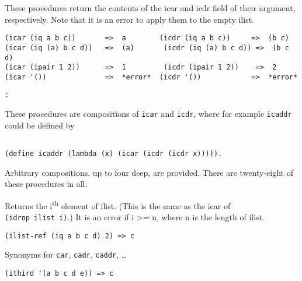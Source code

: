 \begin{entry}{%
  }

  These procedures return
  the contents of the icar and icdr field of their argument,
  respectively. Note that it is an error to apply them to the empty
  ilist.

\begin{verbatim}
(icar (iq a b c))       =>  a        (icdr (iq a b c))     =>  (b c)  
(icar (iq (a) b c d))   =>  (a)       (icdr (iq (a) b c d)) =>  (b c d)
(icar (ipair 1 2))      =>  1         (icdr (ipair 1 2))    =>  2      
(icar '())              =>  *error*  (icdr '())            =>  *error*
\end{verbatim}
\end{entry}
   
\begin{entry}{%
  \texttt{:}\\
  }

  These procedures are
  compositions of \texttt{icar} and \texttt{icdr}, where for example
  \texttt{icaddr} could be defined by

\begin{verbatim}
    
(define icaddr (lambda (x) (icar (icdr (icdr x))))).
\end{verbatim}

  Arbitrary compositions, up to four deep, are provided. There are
  twenty-eight of these procedures in all.
\end{entry}

\begin{entry}{%
  }

  Returns the
  i\textsuperscript{th} element of ilist. (This is the same as the
  icar of \texttt{(idrop\ ilist\ i)}.) It is an error if i
  \textgreater{}= n, where n is the length of ilist.

\begin{verbatim}   
(ilist-ref (iq a b c d) 2) => c
\end{verbatim}
\end{entry}

\begin{entry}{%
  }

Synonyms for
  \texttt{car}, \texttt{cadr}, \texttt{caddr}, \ldots{}

\begin{verbatim}
(ithird '(a b c d e)) => c
\end{verbatim}
\end{entry}

